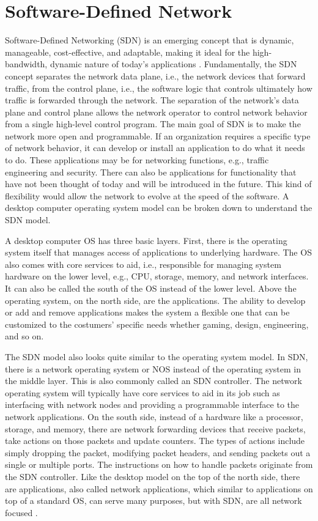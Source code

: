 \section{Software-Defined Network}\label{sec:sdn}
Software-Defined Networking (SDN) is an emerging concept that is dynamic, manageable, cost-effective, and adaptable, making it ideal for the high-bandwidth, dynamic nature of today's applications \cite{sdn-def}. Fundamentally, the SDN concept separates the network data plane, i.e., the network devices that forward traffic, from the control plane, i.e., the software logic that controls ultimately how traffic is forwarded through the network. The separation of the network's data plane and control plane allows the network operator to control network behavior from a single high-level control program. The main goal of SDN is to make the network more open and programmable. If an organization requires a specific type of network behavior, it can develop or install an application to do what it needs to do. These applications may be for networking functions, e.g., traffic engineering and security. There can also be applications for functionality that have not been thought of today and will be introduced in the future. This kind of flexibility would allow the network to evolve at the speed of the software. A desktop computer operating system model can be broken down to understand the SDN model. 

A desktop computer OS has three basic layers. First, there is the operating system itself that manages access of applications to underlying hardware. The OS also comes with core services to aid, i.e., responsible for managing system hardware on the lower level, e.g., CPU, storage, memory, and network interfaces. It can also be called the south of the OS instead of the lower level. Above the operating system, on the north side, are the applications. The ability to develop or add and remove applications makes the system a flexible one that can be customized to the costumers' specific needs whether gaming, design, engineering, and so on.

The SDN model also looks quite similar to the operating system model. In SDN, there is a network operating system or NOS instead of the operating system in the middle layer. This is also commonly called an SDN controller. The network operating system will typically have core services to aid in its job such as interfacing with network nodes and providing a programmable interface to the network applications. On the south side, instead of a hardware like a processor, storage, and memory, there are network forwarding devices that receive packets, take actions on those packets and update counters. The types of actions include simply dropping the packet, modifying packet headers, and sending packets out a single or multiple ports. The instructions on how to handle packets originate from the SDN controller. Like the desktop model on the top of the north side, there are applications, also called network applications, which similar to applications on top of a standard OS, can serve many purposes, but with SDN, are all network focused \cite{6994333}.

